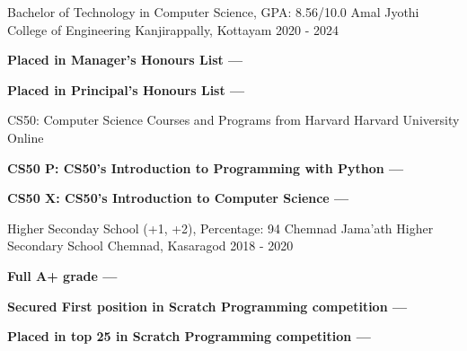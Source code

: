 
\begin{cventries}
  \cventry
    {Bachelor of Technology in Computer Science, GPA: 8.56/10.0} %
    {Amal Jyothi College of Engineering} %
    {Kanjirappally, Kottayam} %
    {2020 - 2024} %
    {
      \begin{cvitems} 
         \item {\textbf{Placed in Manager's Honours List --- }}
         \vspace{1mm}
         \item {\textbf{Placed in Principal's Honours List --- }}
      \end{cvitems}
    }
  \vspace{2mm}
  \cventry
    {CS50: Computer Science Courses and Programs from Harvard} %
    {Harvard University} %
    {Online} %
    {} %
    {
      \begin{cvitems}
         \item {\textbf{CS50 P: CS50's Introduction to Programming with Python --- }}
         \vspace{1mm}
         \item {\textbf{CS50 X: CS50's Introduction to Computer Science --- }}
      \end{cvitems}
    }
  \vspace{2mm}
  \cventry
    {Higher Seconday School (+1, +2), Percentage: 94}
    {Chemnad Jama'ath Higher Secondary School}
    {Chemnad, Kasaragod}
    {2018 - 2020}
    {
      \begin{cvitems} %
         \item {\textbf{Full A+ grade --- }}
         \vspace{1mm}
         \item {\textbf{Secured First position in Scratch Programming competition --- }}
         \vspace{1mm}
         \item {\textbf{Placed in top 25 in Scratch Programming competition --- }}
      \end{cvitems}
    }
\end{cventries}
